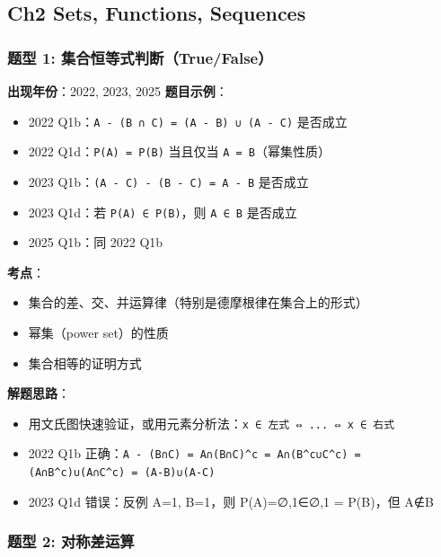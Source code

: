 \documentclass[10pt,a4paper,openany]{ctexbook}
\theoremstyle{definition}
\theoremstyle{remark}
\begin{document}
\vspace{-2pt}

\subsection{Ch2 Sets, Functions, Sequences}

\vspace{-2pt}

\subsubsection{题型 1: 集合恒等式判断（True/False）}

\textbf{出现年份}：2022, 2023, 2025
\textbf{题目示例}：
\begin{itemize}
\item 2022 Q1b：\texttt{A - (B ∩ C) = (A - B) ∪ (A - C)} 是否成立
\item 2022 Q1d：\texttt{P(A) = P(B)} 当且仅当 \texttt{A = B}（幂集性质）
\item 2023 Q1b：\texttt{(A - C) - (B - C) = A - B} 是否成立
\item 2023 Q1d：若 \texttt{P(A) ∈ P(B)}，则 \texttt{A ∈ B} 是否成立
\item 2025 Q1b：同 2022 Q1b

\end{itemize}

\textbf{考点}：
\begin{itemize}
\item 集合的差、交、并运算律（特别是德摩根律在集合上的形式）
\item 幂集（power set）的性质
\item 集合相等的证明方式

\end{itemize}

\textbf{解题思路}：
\begin{itemize}
\item 用文氏图快速验证，或用元素分析法：\texttt{x ∈ 左式 ⇔ ... ⇔ x ∈ 右式}
\item 2022 Q1b 正确：\texttt{A - (B∩C) = A∩(B∩C)\^{}c = A∩(B\^{}c∪C\^{}c) = (A∩B\^{}c)∪(A∩C\^{}c) = (A-B)∪(A-C)}
\item 2023 Q1d 错误：反例 A={1}, B={{1}}，则 P(A)={∅,{1}}∈{∅,{{1}}} = P(B)，但 A∉B

\end{itemize}

\vspace{-2pt}

\subsubsection{题型 2: 对称差运算}
\end{document}
